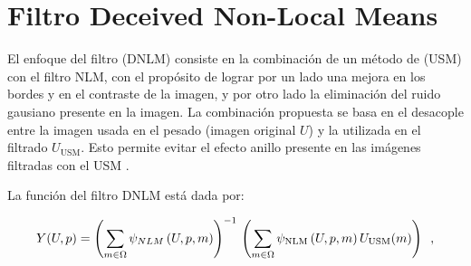 \section{Filtro Deceived Non-Local Means}
\label{ch:marco_dnlm}


El enfoque del filtro  (DNLM) consiste en la combinaci\'on de un m\'etodo de  (USM) con el filtro NLM, con el prop\'osito de lograr por un lado una mejora en los bordes y en el contraste de la imagen, y por otro lado la eliminaci\'on del ruido gausiano  presente en la imagen. La combinaci\'on propuesta se basa en el desacople entre la imagen usada en el pesado (imagen original $U$) y la utilizada en el filtrado $U_{\textrm{USM}}$. Esto permite evitar el efecto anillo presente en las im\'agenes filtradas con el USM \cite{calderon2015dewaff}.

La funci\'on del filtro DNLM est\'a dada por:

\begin{equation}
\label{eq:dnlm}
Y(U,p)=\left(\sum_{m\in \Omega}\psi_{NLM}\left(U, p, m\right)\right)^{-1} \\ \left(\sum_{m\in \Omega}\psi_{\textrm{NLM}}\left(U, p, m\right)U_{\textrm{USM}}(m)\right) \enspace ,
\end{equation}


